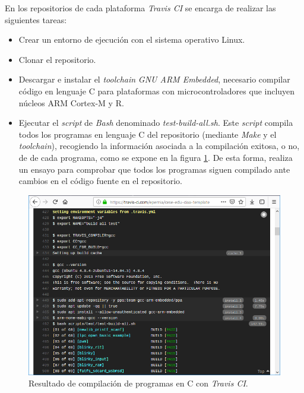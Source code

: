 
En los repositorios de cada plataforma \emph{Travis CI} se encarga de realizar las siguientes tareas:

\begin{itemize}
\item
Crear un entorno de ejecución con el sistema operativo Linux.
\item
Clonar el repositorio.
\item
Descargar e instalar el \emph{toolchain} \emph{GNU ARM Embedded}, necesario compilar código en lenguaje C para plataformas con microcontroladores que incluyen núcleos ARM Cortex-M y R.
\item
Ejecutar el \emph{script} de \emph{Bash} \citep{Bash} denominado \emph{test-build-all.sh}. Este \emph{script} compila todos los programas en lenguaje C del repositorio (mediante \emph{Make} y el \emph{toolchain}), recogiendo la información asociada a la compilación exitosa, o no, de de cada programa, como se expone en la figura \ref{fig:testTravisC}. De esta forma, realiza un ensayo para comprobar que todos los programas siguen compilado ante cambios en el código fuente en el repositorio.
\end{itemize}

\begin{figure}[!htbp]
\begin{center}  %
\includegraphics*[width=14cm]{Figures/travisBuildC.png}
\par\caption{Resultado de compilación de programas en C con \emph{Travis CI}.}\label{fig:testTravisC}
\end{center}
\end{figure}

